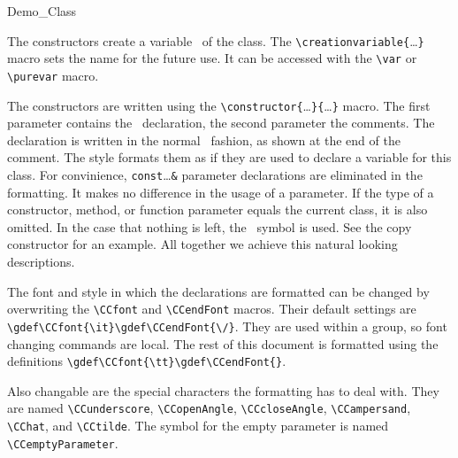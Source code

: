 \documentclass[12pt]{article}
\begin{document}
\begin{CCclass}{Demo_Class}
{
\CCcreation

The constructors create a variable \CCvar\ of the class. The
\verb"\"\verb"creationvariable{"\ldots\verb"}" macro sets the name for the
future use. It can be accessed with the \verb"\"\verb"var" or
\verb"\"\verb"purevar" macro.

The constructors are written using the
\verb"\"\verb"constructor{"\ldots\verb"}{"\ldots\verb"}" macro. The first
parameter contains the \CC\ declaration, the second parameter the comments.
The declaration is written in the normal \CC\ fashion, as shown at the end
of the comment. The style formats them as if they are used
to declare a variable for this class. For convinience,
\verb"const"\ldots\verb"&" parameter declarations are eliminated in the
formatting. It makes no difference in the usage of a parameter. If the
type of a constructor, method, or function parameter equals the
current class, it is also omitted. In the case that nothing is left,
the \CCemptyParameter\ symbol is used. See the copy constructor for an
example. All together we achieve this natural looking descriptions.





The font and style in which the declarations are formatted can be
changed by overwriting the \verb"\CCfont" and \verb"\CCendFont"
macros. Their default settings are
\verb"\gdef\CCfont{\it}\gdef\CCendFont{\/}". They are used within a
group, so font changing commands are local. The rest of this document is
formatted using the definitions \verb"\gdef\CCfont{\tt}\gdef\CCendFont{}".

\gdef\CCfont{\tt}\gdef\CCendFont{}

\gdef\CCfont{\it}\gdef\CCendFont{\/}

Also changable are the special characters the formatting has to
deal with. They are named \verb"\CCunderscore", \verb"\CCopenAngle",
\verb"\CCcloseAngle", \verb"\CCampersand", \verb"\CChat", and
\verb"\CCtilde". The symbol for the empty parameter is named
\verb"\CCemptyParameter".

}
\end{CCclass}
\end{document}
